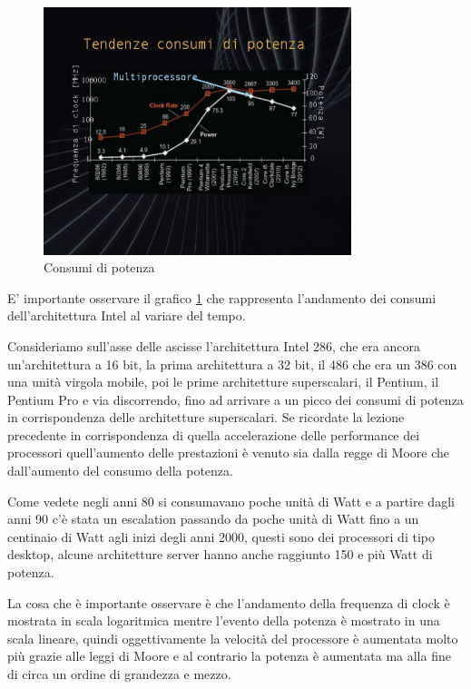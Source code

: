 \begin{figure}[H]
  \centering
  \includegraphics[width=0.8\textwidth,
                    trim=50 110 45 100, %
                    clip]
                    {images/Lez02_p01_fig_04.png}
  \caption{Consumi di potenza
  \label{fig:Lez02_p01_fig_04}}
\end{figure}


E' importante osservare il grafico \ref{fig:Lez02_p01_fig_04} che rappresenta l'andamento dei consumi dell'architettura Intel al variare del tempo.

Consideriamo sull'asse delle ascisse l'architettura Intel 286, che era ancora un'architettura a 16 bit, la prima architettura a 32 bit, il 486 che era un 386 con una unità virgola mobile, poi le prime architetture superscalari, il Pentium, il Pentium Pro e via discorrendo, fino ad arrivare a un picco dei consumi di potenza in corrispondenza delle architetture superscalari. Se ricordate la lezione precedente in corrispondenza di quella accelerazione delle performance dei processori quell'aumento delle prestazioni è venuto sia dalla regge di Moore che dall'aumento del consumo della potenza.

Come vedete negli anni 80 si consumavano poche unità di Watt e a partire dagli anni 90 c'è stata un escalation passando da poche unità di Watt fino a un centinaio di Watt agli inizi degli anni 2000, questi sono dei processori di tipo desktop, alcune architetture server hanno anche raggiunto 150 e più Watt di potenza.

La cosa che è importante osservare è che l'andamento della frequenza di clock è mostrata in scala logaritmica mentre l'evento della potenza è mostrato in una scala lineare, quindi oggettivamente la velocità del processore è aumentata molto più grazie alle leggi di Moore e al contrario la potenza è aumentata ma alla fine di circa un ordine di grandezza e mezzo.

